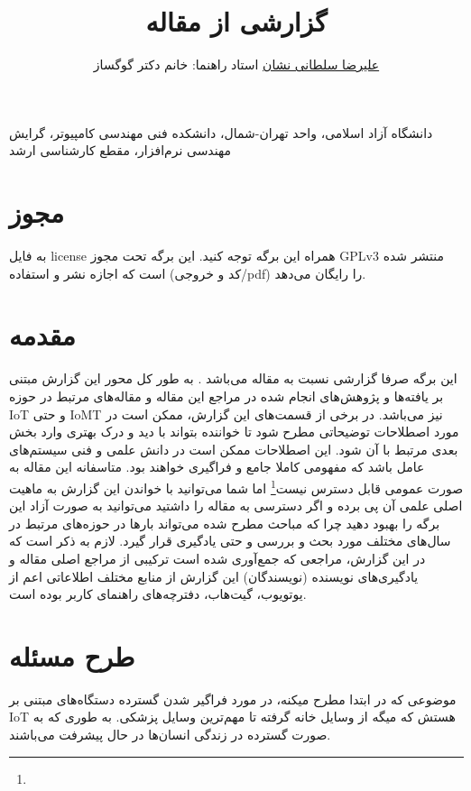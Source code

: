 \documentclass[10pt, a4paper]{article}
\title{گزارشی از مقاله \lr{Reliable Real-Time Operating System for IoT Devices}}
\author{\href{mailto:a.soltani@iau-tnb.ac.ir}{علیرضا سلطانی نشان} \small{استاد
راهنما: خانم دکتر گوگساز}}
\begin{document}
\maketitle

دانشگاه آزاد اسلامی، واحد تهران-شمال، دانشکده فنی مهندسی کامپیوتر، گرایش مهندسی
نرم‌افزار، مقطع کارشناسی ارشد

\tableofcontents

\section{مجوز}

به فایل license همراه این برگه توجه کنید. این برگه تحت مجوز GPLv3 منتشر شده است
که اجازه نشر و استفاده (کد و خروجی/pdf) را رایگان می‌دهد.

\section{مقدمه}

این برگه صرفا گزارشی نسبت به مقاله  می‌باشد \cite{hahm2020reliable}. به طور کل محور این گزارش مبتنی بر
یافته‌ها و پژوهش‌های انجام شده در مراجع این مقاله و مقاله‌های مرتبط در حوزه IoT
و حتی IoMT نیز می‌باشد. در برخی از قسمت‌های این گزارش، ممکن است در مورد اصطلاحات
توضیحاتی مطرح شود تا خواننده بتواند با دید و درک بهتری وارد بخش بعدی مرتبط با آن
شود. این اصطلاحات ممکن است در دانش علمی و فنی سیستم‌های عامل باشد که مفهومی
کاملا جامع و فراگیری خواهند بود. متاسفانه این مقاله به صورت عمومی قابل دسترس
نیست\footnote{} اما شما می‌توانید با خواندن این گزارش به ماهیت
اصلی علمی آن پی برده و اگر دسترسی به مقاله را داشتید می‌توانید به صورت آزاد این
برگه را بهبود دهید چرا که مباحث مطرح شده می‌تواند بار‌ها در حوزه‌های مرتبط در
سال‌های مختلف مورد بحث و بررسی و حتی یادگیری قرار گیرد. لازم به ذکر است که در
این گزارش، مراجعی که جمع‌آوری شده است ترکیبی از مراجع اصلی مقاله و یادگیری‌های
نویسنده (نویسندگان) این گزارش از منابع مختلف اطلاعاتی اعم از یوتویوب، گیت‌هاب،
دفترچه‌های راهنمای کاربر بوده است.

\section{طرح مسئله}

موضوعی که در ابتدا مطرح میکنه، در مورد فراگیر شدن گسترده دستگاه‌های مبتنی بر IoT
هستش که میگه از وسایل خانه گرفته تا مهم‌ترین وسایل پزشکی. به طوری که به صورت
گسترده در زندگی انسان‌ها در حال پیشرفت می‌باشند. 
\end{document}
